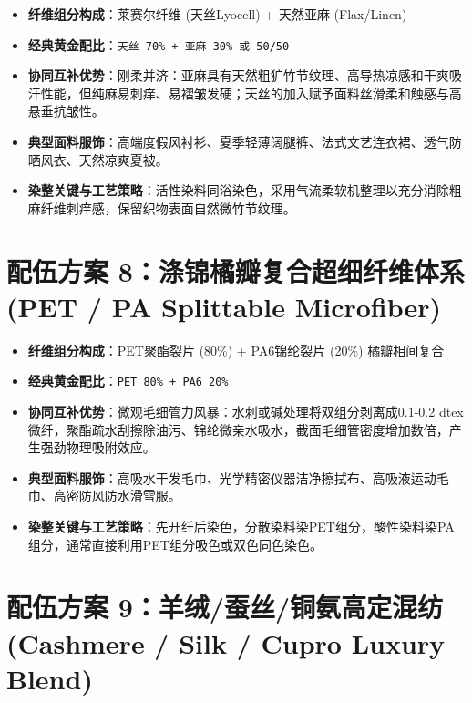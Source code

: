 \documentclass[11pt,openright,twoside,UTF8]{ctexbook}
\begin{document}
\begin{itemize} \setlength{\itemsep}{2.5pt}
    \item \textbf{纤维组分构成}：莱赛尔纤维 (天丝Lyocell) + 天然亚麻 (Flax/Linen)
    \item \textbf{经典黄金配比}：\texttt{天丝 70\% + 亚麻 30\% 或 50/50}
    \item \textbf{协同互补优势}：刚柔并济：亚麻具有天然粗犷竹节纹理、高导热凉感和干爽吸汗性能，但纯麻易刺痒、易褶皱发硬；天丝的加入赋予面料丝滑柔和触感与高悬垂抗皱性。
    \item \textbf{典型面料服饰}：高端度假风衬衫、夏季轻薄阔腿裤、法式文艺连衣裙、透气防晒风衣、天然凉爽夏被。
    \item \textbf{染整关键与工艺策略}：活性染料同浴染色，采用气流柔软机整理以充分消除粗麻纤维刺痒感，保留织物表面自然微竹节纹理。
\end{itemize}
\vspace{0.3cm}

\section{配伍方案 8：涤锦橘瓣复合超细纤维体系 (PET / PA Splittable Microfiber)}

\begin{itemize} \setlength{\itemsep}{2.5pt}
    \item \textbf{纤维组分构成}：PET聚酯裂片 (80\%) + PA6锦纶裂片 (20\%) 橘瓣相间复合
    \item \textbf{经典黄金配比}：\texttt{PET 80\% + PA6 20\%}
    \item \textbf{协同互补优势}：微观毛细管力风暴：水刺或碱处理将双组分剥离成0.1-0.2 dtex微纤，聚酯疏水刮擦除油污、锦纶微亲水吸水，截面毛细管密度增加数倍，产生强劲物理吸附效应。
    \item \textbf{典型面料服饰}：高吸水干发毛巾、光学精密仪器洁净擦拭布、高吸液运动毛巾、高密防风防水滑雪服。
    \item \textbf{染整关键与工艺策略}：先开纤后染色，分散染料染PET组分，酸性染料染PA组分，通常直接利用PET组分吸色或双色同色染色。
\end{itemize}
\vspace{0.3cm}

\section{配伍方案 9：羊绒/蚕丝/铜氨高定混纺 (Cashmere / Silk / Cupro Luxury Blend)}
\end{document}

